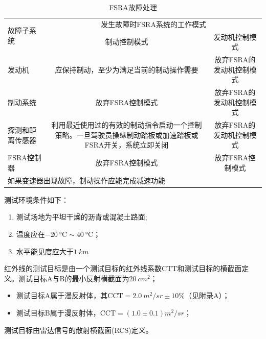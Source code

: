 \documentclass[is,copyright,is]{isov2}
\begin{document}
\begin{table}[htbp]
	\centering
	\caption{FSRA故障处理}
	\begin{tabular}{|p{10em}|c|c|}
		\hline
		\multirow{2}[4]{*}{故障子系统} & \multicolumn{2}{p{30em}|}{发生故障时FSRA系统的工作模式} \\
		\cline{2-3}    \multicolumn{1}{|c|}{} & \multicolumn{1}{p{15em}|}{制动控制模式} & \multicolumn{1}{p{15em}|}{发动机控制模式} \\
		\hline
		发动机   & \multicolumn{1}{p{15em}|}{应保持制动，至少为满足当前的制动操作需要} & \multicolumn{1}{p{15em}|}{放弃FSRA的发动机控制模式} \\
		\hline
		制动系统 & \multicolumn{1}{p{10em}|}{放弃FSRA控制模式} & \multicolumn{1}{p{10em}|}{放弃FSRA的发动机控制模式} \\
			\hline
		探测和距离传感器 & \multicolumn{1}{p{20em}|}{利用最近使用过的有效的制动指令启动一个控制策略。一旦驾驶员操纵制动踏板或加速踏板或FSRA开关，系统立即关闭} & \multicolumn{1}{p{15em}|}{放弃FSRA的发动机控制模式} \\
			\hline
		FSRA控制器 & \multicolumn{1}{p{20em}|}{放弃FSRA控制模式} & \multicolumn{1}{p{15em}|}{放弃FSRA控制模式} \\
		\hline
		\multicolumn{3}{|p{30em}|}{如果变速器出现故障，制动操作应能完成减速功能} \\
		\bottomrule
	\end{tabular}%
	\label{tab:acc2a}%
\end{table}%
测试环境条件如下：
\begin{enumerate}
	\item 测试场地为平坦干燥的沥青或混凝土路面;
	\item 温度应在$\SI{-20}{\celsius}\sim \SI{40}{\celsius}$；
	\item 水平能见度应大于$\SI{1}{km}$
\end{enumerate}
\label{7.2}
红外线的测试目标是由一个测试目标的红外线系数CTT和测试目标的横截面定义。测试目标A与B的最小反射横截面为$\SI{20}{cm^2}$；
\begin{itemize}
	\item 测试目标A属于漫反射体，其$\text{CCT} = \SI{2.0}{m^2/sr} \pm 10\% $（见附录A）；
	\item 测试目标B属于漫反射体，$\text{CCT} = (1.0 \pm 0.1)\si{m^2/sr} $；
\end{itemize}
测试目标由雷达信号的散射横截面(RCS)定义。
\end{document}
